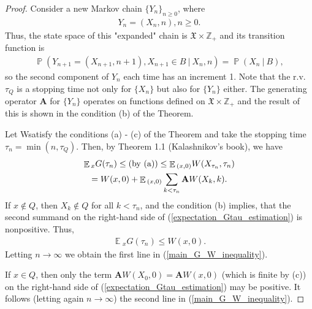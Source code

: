 \documentclass[10pt, reqno]{amsart}
\theoremstyle{definition}
\newcommand{\aasVar}{Q} %
\newcommand{\astVar}{\tau} %
\newcommand{\gtfVar}{G} %
\newcommand{\wtfVar}{W} %
\newcommand{\atoVar}{\mathbf{A}} %
\newcommand{\assVar}{\mathfrak{X}} %
\newcommand{\integers}{\mathbb{Z}} %
\DeclareMathOperator*{\E}{\mathbb{E}}
\DeclareMathOperator*{\Pb}{\mathbb{P}}
\begin{document}
	\begin{proof}
		Consider a new Markov chain $\{Y_{n}\}_{n \geq 0}$, where
		\begin{gather*}
		Y_{n} = (X_{n}, n), n \geq 0.
		\end{gather*}
		Thus, the state space of this "expanded" chain is $\assVar \times \integers_{+}$ and its transition function is
		\begin{gather*}
		\Pb(Y_{n+1} = (X_{n+1}, n+1), X_{n+1} \in B \: | \: X_{n}, n) = \Pb(X_{n} \: | \: B),
		\end{gather*}
		so the second component of $Y_{n}$ each time has an increment 1. Note that the r.v. $\astVar_{\aasVar}$ is a stopping time not only for $\{X_{n}\}$ but also for $\{Y_{n}\}$ either. The generating operator $\atoVar$ for $\{Y_{n}\}$ operates on functions defined on $\assVar \times \integers_{+}$ and the result of this is shown in the condition (b) of the Theorem.
		
		Let \wtfVar satisfy the conditions (a) - (c) of the Theorem and take the stopping time $\astVar_{n} = \min(n, \astVar_{\aasVar})$. Then, by Theorem 1.1 (Kalashnikov's book), we have
		\begin{gather}
		\E{}_{x}\gtfVar(\astVar_{n}) \leq \text{(by (a))} \leq \E{}_{(x, 0)}\wtfVar(X_{\astVar_{n}}, \astVar_{n}) \notag \\ = \wtfVar(x, 0) + \E{}_{(x, 0)}\sum_{k < \astVar_{n}}\atoVar\wtfVar(X_{k}, k).
		\label{expectation_Gtau_estimation}
		\end{gather}
		If $x \notin \aasVar$, then $X_{k} \notin \aasVar$ for all $k < \astVar_{n}$, and the condition (b) implies, that the second summand on the right-hand side of (\ref{expectation_Gtau_estimation}) is nonpositive. Thus,
		\begin{gather*}
		\E{}_{x}\gtfVar(\astVar_{n}) \leq \wtfVar(x, 0).
		\end{gather*}
		Letting $n \xrightarrow{} \infty$ we obtain the first line in (\ref{main_G_W_inequality}).
		
		If $x \in \aasVar$, then only the term $\atoVar\wtfVar(X_{0}, 0) = \atoVar\wtfVar(x, 0)$ (which is finite by (c)) on the right-hand side of (\ref{expectation_Gtau_estimation}) may be positive. It follows (letting again $n \xrightarrow{} \infty$) the second line in (\ref{main_G_W_inequality}).
		

\end{proof}
\end{document}
